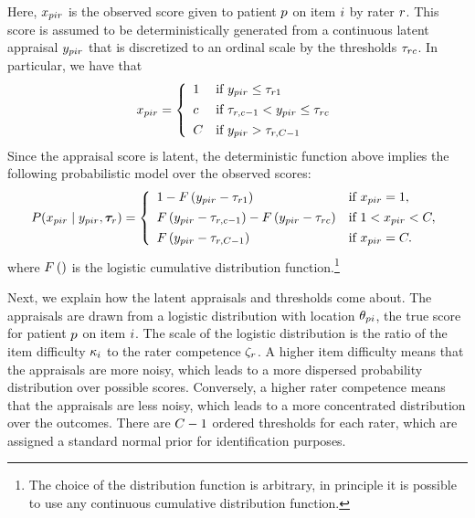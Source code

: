 \documentclass[a4paper,11pt]{article}
\begin{document}
Here, $x_{pir}$ is the observed score given to patient $p$ on item $i$ by rater $r$.
This score is assumed to be deterministically generated from a continuous latent appraisal $y_{pir}$ that is discretized to an ordinal scale by the thresholds $\tau_{rc}$.
In particular, we have that
\begin{align*}
\oneScore =
\left\{\begin{array}{ll}
1		& \text{if }  \Appraisal_{\Ipatient\Iitem\Irater} \leq \Threshold_{\Irater 1} \\[4pt]
\Incat	& \text{if }  \Threshold_{\Irater, \Incat - 1} < \Appraisal_{\Ipatient\Iitem\Irater} \leq \Threshold_{\Irater\Incat} \\[4pt]
\Tncat	& \text{if }  \Appraisal_{\Ipatient\Iitem\Irater} > \Threshold_{\Irater,\Tncat-1}
\end{array} \right.
\end{align*}
Since the appraisal score is latent, the deterministic function above implies the following probabilistic model over the observed scores:
\begin{align*}
P(\oneScore\mid \oneAppraisal,\bm{\Threshold}_{\Irater}) =
\left\{\begin{array}{ll}
1 - \cdf{\Appraisal_{\Ipatient\Iitem\Irater} - \Threshold_{\Irater 1}}         & \text{if } \oneScore = 1, \\[4pt]
\cdf{\oneAppraisal - \Threshold_{\Irater,\Incat-1}} -
\cdf{\oneAppraisal - \Threshold_{\Irater\Incat}}         & \text{if } 1 < \oneScore < \Tncat,\\[4pt]
\cdf{\oneAppraisal - \Threshold_{\Irater,\Tncat-1}}       & \text{if } \oneScore = \Tncat.
\end{array} \right.
\end{align*}
where $F\left(\right)$ is the logistic cumulative distribution function.\footnote{%
	The choice of the distribution function is arbitrary, in principle it is possible to use any continuous cumulative distribution function.
}

Next, we explain how the latent appraisals and thresholds come about.
The appraisals are drawn from a logistic distribution with location $\theta_{pi}$, the true score for patient $p$ on item $i$. The scale of the logistic distribution is the ratio of the item difficulty $\kappa_i$ to the rater competence $\zeta_r$.
A higher item difficulty means that the appraisals are more noisy, which leads to a more dispersed probability distribution over possible scores.
Conversely, a higher rater competence means that the appraisals are less noisy, which leads to a more concentrated distribution over the outcomes.
There are $\Tncat - 1$ ordered thresholds for each rater, which are assigned a standard normal prior for identification purposes.
\end{document}
